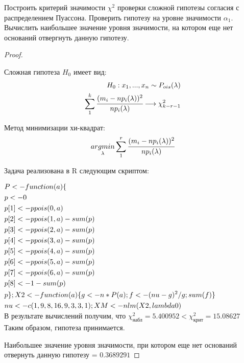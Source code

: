 \begin{problem}
	Построить критерий значимости $\chi^2$ проверки сложной гипотезы согласия с распределением Пуассона. Проверить гипотезу на уровне значимости $\alpha_1$. Вычислить наибольшее значение уровня значимости, на котором еще нет оснований отвергнуть данную гипотезу. 
\end{problem}

\begin{proof}
	$ $
	
	Сложная гипотеза $H_0$ имеет вид:
	\begin{align}
		H_0: x_1,...,x_n \sim P_{ois}(\lambda) \\
		\sum\limits_1^k\cfrac{(m_i-np_i(\lambda))^2}{np_i(\lambda)}\longrightarrow\chi^2_{k-r-1}
	\end{align}	

	Метод минимизации хи-квадрат:
	\begin{equation}
		\underset{\lambda}{argmin}\sum\limits_1^r\cfrac{(m_i-np_i(\lambda))^2}{np_i(\lambda)}
	\end{equation}
	
	Задача реализована в R следующим скриптом: 
	
	$\begin{gathered}
		P <- function(a)\{ \hfill \\
        p <- 0 \hfill \\
        p[1] <- ppois(0, a) \hfill \\
        p[2] <- ppois(1, a) - sum(p) \hfill \\
        p[3] <- ppois(2, a) - sum(p) \hfill \\
        p[4] <- ppois(3, a) - sum(p) \hfill \\
        p[5] <- ppois(4, a) - sum(p) \hfill \\
        p[6] <- ppois(5, a) - sum(p) \hfill \\
        p[7] <- ppois(6, a) - sum(p) \hfill \\
        p[8] <- 1-sum(p) \hfill \\
        p\}; X2 <- function(a)\{g <- n*P(a); f <- (nu-g)^2/g; sum(f)\} \hfill \\
        nu <- c(1,9,8,16,9,3,3,1); XM <- nlm(X2, lambda0) \hfill \\
	\end{gathered}$ \\
	
	В результате вычислений получим, что $\chi^2_{\text{набл}}=5.400952<\chi^2_{\text{крит}}=15.08627$ 
	Таким образом, гипотеза принимается. 
	
	Наибольшее значение уровня значимости, при котором еще нет оснований отвернуть данную гипотезу = $0.3689291$	
\end{proof}

